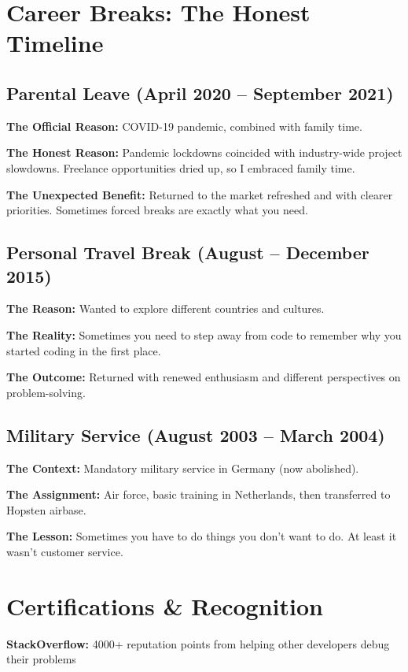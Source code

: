\documentclass[11pt,a4paper]{article}
\begin{document}
\section{Career Breaks: The Honest Timeline}

\subsection{Parental Leave (April 2020 -- September 2021)}
\textbf{The Official Reason:} COVID-19 pandemic, combined with family time.

\textbf{The Honest Reason:} Pandemic lockdowns coincided with industry-wide project slowdowns. Freelance opportunities dried up, so I embraced family time.

\textbf{The Unexpected Benefit:} Returned to the market refreshed and with clearer priorities. Sometimes forced breaks are exactly what you need.

\subsection{Personal Travel Break (August -- December 2015)}
\textbf{The Reason:} Wanted to explore different countries and cultures.

\textbf{The Reality:} Sometimes you need to step away from code to remember why you started coding in the first place.

\textbf{The Outcome:} Returned with renewed enthusiasm and different perspectives on problem-solving.

\subsection{Military Service (August 2003 -- March 2004)}
\textbf{The Context:} Mandatory military service in Germany (now abolished).

\textbf{The Assignment:} Air force, basic training in Netherlands, then transferred to Hopsten airbase.

\textbf{The Lesson:} Sometimes you have to do things you don't want to do. At least it wasn't customer service.

\section{Certifications \& Recognition}

\textbf{StackOverflow:} 4000+ reputation points from helping other developers debug their problems
\end{document}
